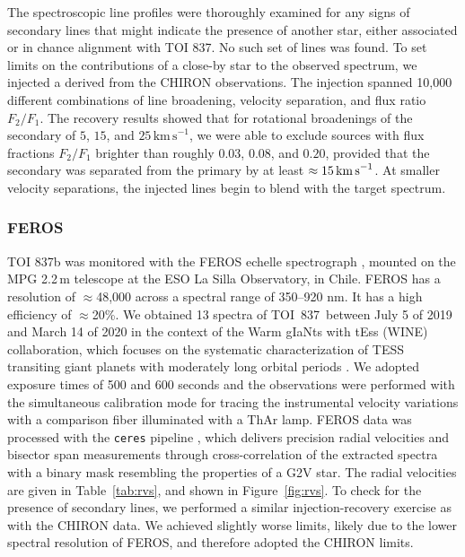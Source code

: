 \documentclass[12pt,twocolumn,tighten]{aastex63}
\newcommand{\tn}{TOI~837} %
\begin{document}
The spectroscopic line profiles were thoroughly examined for any signs
of secondary lines that might indicate the presence of another star,
either associated or in chance alignment with TOI 837. No such set of
lines was found. To set limits on the contributions of a close-by star
to the observed spectrum, we injected a  derived from the CHIRON
observations.  The injection spanned 10,000 different combinations of
line broadening, velocity separation, and flux ratio $F_2/F_1$.  The
recovery results showed that for rotational broadenings of the
secondary of $5$, $15$, and $25\,\mathrm{km\,s}^{-1}$, we were able to
exclude sources with flux fractions $F_2/F_1$ brighter than roughly
$0.03$, $0.08$, and $0.20$, provided that the secondary was separated
from the primary by at least $\approx 15\,{\rm km\,s}^{-1}$.  At
smaller velocity separations, the injected lines begin to blend with
the target spectrum. 



\subsubsection{FEROS}
TOI 837b was monitored with the FEROS echelle spectrograph
\citep{kaufer_commissioning_1999}, mounted on the MPG 2.2$\,$m
telescope at the ESO La Silla Observatory, in Chile. FEROS has a
resolution of $\approx$48,000 across a spectral range of 350–920 nm.
It has a high efficiency of $\approx$20\%. We obtained 13 spectra of
\tn\ between July 5 of 2019 and March 14 of 2020 in the context of the
Warm gIaNts with tEss (WINE) collaboration, which focuses on the
systematic characterization of TESS transiting giant planets with
moderately long orbital periods \citep[{\it
e.g.},][]{brahm:2019,jordan:2020}.  We adopted exposure times of 500
and 600 seconds and the observations were performed with the
simultaneous calibration mode for tracing the instrumental velocity
variations with a comparison fiber illuminated with a ThAr lamp. FEROS
data was processed with the \texttt{ceres} pipeline
\citep{brahm_2017_ceres}, which delivers precision radial velocities
and bisector span measurements through cross-correlation of the
extracted spectra with a binary mask resembling the properties of a
G2V star. The radial velocities are given in Table~\ref{tab:rvs}, and
shown in Figure~\ref{fig:rvs}.  To check for the presence of secondary
lines, we performed a similar injection-recovery exercise as with the
CHIRON data.  We achieved slightly worse limits, likely due to the
lower spectral resolution of FEROS, and therefore adopted the CHIRON
limits.
\end{document}
